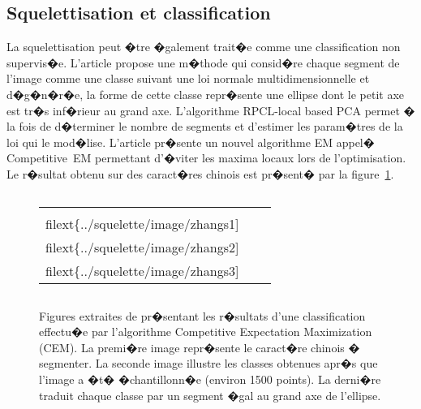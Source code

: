 \subsection{Squelettisation et classification}
\label{squelette_cem_classification}


La squelettisation peut �tre �galement trait�e comme une classification non supervis�e. L'article  propose une m�thode qui consid�re chaque segment de l'image comme une classe suivant une loi normale multidimensionnelle et d�g�n�r�e, la forme de cette classe repr�sente une ellipse dont le petit axe est tr�s inf�rieur au grand axe. L'algorithme RPCL-local based PCA permet � la fois de d�terminer le nombre de segments et d'estimer les param�tres de la loi qui le mod�lise. L'article  pr�sente un nouvel algorithme EM appel� Competitive~EM permettant d'�viter les maxima locaux lors de l'optimisation. Le r�sultat obtenu sur des caract�res chinois est pr�sent� par la figure~\ref{image_zhangb_cem}.


            \begin{figure}[ht]
        $$\begin{tabular}{|c|c|c|} \hline
        \texttt{[image: \\filext\{../squelette/image/zhangs1]}} &
        \texttt{[image: \\filext\{../squelette/image/zhangs2]}} &
        \texttt{[image: \\filext\{../squelette/image/zhangs3]}} \\ \hline
        \end{tabular}$$
        \caption{    Figures extraites de  pr�sentant les r�sultats d'une classification
                            effectu�e par l'algorithme Competitive Expectation Maximization (CEM). 
                            La premi�re image repr�sente le caract�re chinois � segmenter.
                            La seconde image illustre les classes obtenues apr�s que l'image a �t� �chantillonn�e 
                            (environ 1500 points). La derni�re traduit chaque classe par un segment �gal 
                            au grand axe de l'ellipse.    }
        \label{image_zhangb_cem}
            \end{figure}
















\newpage








